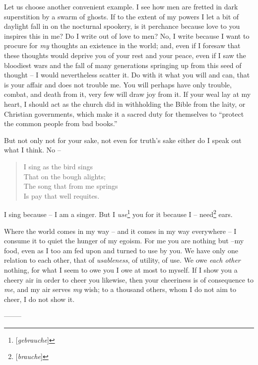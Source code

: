\documentclass[12pt,a4paper]{book}
\begin{document}
Let us choose another convenient example. I see how men are fretted in dark 
superstition by a swarm of ghosts. If to the extent of my powers I let a bit 
of daylight fall in on the nocturnal spookery, is it perchance because love to 
you inspires this in me? Do I write out of love to men? No, I write because I 
want to procure for \textit{my} thoughts an existence in the world; and, even 
if I foresaw that these thoughts would deprive you of your rest and your 
peace, even if I saw the bloodiest wars and the fall of many generations 
springing up from this seed of thought -- I would nevertheless scatter it. Do 
with it what you will and can, that is your affair and does not trouble me. 
You will perhaps have only trouble, combat, and death from it, very few will 
draw joy from it. If your weal lay at my heart, I should act as the church did 
in withholding the Bible from the laity, or Christian governments, which make 
it a sacred duty for themselves to ``protect the common people from bad 
books.''

But not only not for your sake, not even for truth's sake either do I speak 
out what I think. No --

\begin{quotation}

\noindent{}I sing as the bird sings\\
 That on the bough alights;\\
 The song that from me springs\\
 Is pay that well requites.\end{quotation}

\noindent{}I sing because -- I am a singer. But I 
\textit{use}\footnote{[\textit{gebrauche}]} you for it because I -- 
need\footnote{[\textit{brauche}]} ears.

Where the world comes in my way -- and it comes in my way everywhere -- I 
consume it to quiet the hunger of my egoism. For me you are nothing but --my 
food, even as I too am fed upon and turned to use by you. We have only one 
relation to each other, that of \textit{usableness}, of utility, of use. We 
owe \textit{each other} nothing, for what I seem to owe you I owe at most to 
myself. If I show you a cheery air in order to cheer you likewise, then your 
cheeriness is of consequence to \textit{me}, and my air serves \textit{my} 
wish; to a thousand others, whom I do not aim to cheer, I do not show it.

\begin{center}
--------\end{center}
\end{document}
